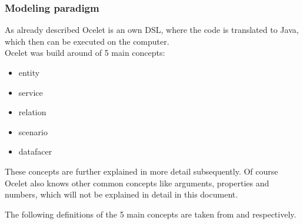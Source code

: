 \subsubsection{Modeling paradigm}
\par
As already described Ocelet is an own DSL, where the code is translated to Java, which then can be executed on the computer.\\
Ocelet was build around of 5 main concepts:
\begin{itemize}
	\item entity
	\item service
	\item relation
	\item scenario
	\item datafacer
\end{itemize}
These concepts are further explained in more detail subsequently. Of course Ocelet also knows other common concepts like arguments, properties and numbers, which will not be explained in detail in this document.
\par
The following definitions of the 5 main concepts are taken from \autocite{dsl:ocelet-onto} and \autocite{dsl:ocelet-design} respectively.
